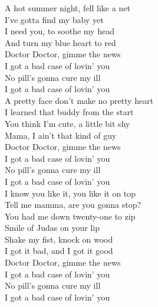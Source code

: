     {

        A hot summer night, fell like a net \\
        I've gotta find my baby yet\\
        I need you, to soothe my head\\
        And turn my blue heart to red\\

        Doctor Doctor, gimme the news\\
        I got a bad case of lovin' you\\
        No pill's gonna cure my ill\\
        I got a bad case of lovin' you\\

        A pretty face don't make no pretty heart\\
        I learned that buddy from the start\\
        You think I'm cute, a little bit shy\\
        Mama, I ain't that kind of guy\\

        Doctor Doctor, gimme the news\\
        I got a bad case of lovin' you\\
        No pill's gonna cure my ill\\
        I got a bad case of lovin' you\\

        I know you like it, you like it on top\\
        Tell me mamma, are you gonna stop?\\

        You had me down twenty-one to zip\\
        Smile of Judas on your lip\\
        Shake my fist, knock on wood\\
        I got it bad, and I got it good\\

        Doctor Doctor, gimme the news\\
        I got a bad case of lovin' you\\
        No pill's gonna cure my ill\\
        I got a bad case of lovin' you\\
    }